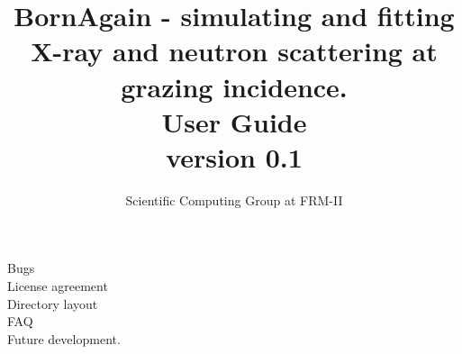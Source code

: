 \documentclass[article,10pt]{report}
\title{
BornAgain - simulating and fitting X-ray and neutron scattering at grazing incidence. \\
\vspace*{10mm} User Guide \\
\large{ version 0.1}
}
\author{Scientific Computing Group at FRM-II}
\newcommand\BackgroundPic{%
\put(0,0){%
\parbox[b][\paperheight]{\paperwidth}{%
\vfill
\centering
\texttt{[image: results2\_2.png]}%
\vfill
}}}
\begin{document}
\maketitle



\tableofcontents




%
%
%
%
%


Bugs\\ License agreement\\ Directory layout \\ FAQ \\ Future development.
%





\end{document}
